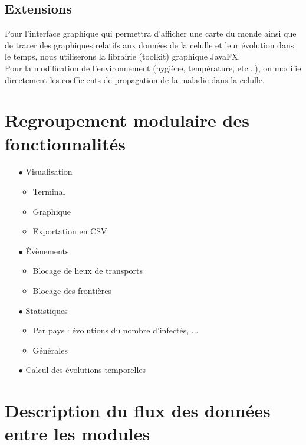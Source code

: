 \documentclass[12pt,a4paper]{report}
\begin{document}
\subsection*{Extensions}
\begin{flushleft}
 	Pour l'interface graphique qui permettra d'afficher une carte du monde ainsi que de tracer des graphiques relatifs aux données de la celulle et leur évolution dans le temps, nous utiliserons la librairie (toolkit) graphique JavaFX. \\
	Pour la modification de l'environnement (hygiène, température, etc...), on modifie directement les coefficients de propagation de la maladie dans la celulle.
\end{flushleft}

\section*{Regroupement modulaire des fonctionnalités}
\begin{flushleft}
	\begin{itemize}
		\item[$\bullet$] Visualisation
			\begin{itemize}
				\item Terminal
				\item Graphique
				\item Exportation en CSV
			\end{itemize}
		\item[$\bullet$] Évènements
			\begin{itemize}
				\item Blocage de lieux de transports
				\item Blocage des frontières
			\end{itemize}
		\item[$\bullet$] Statistiques
			\begin{itemize}
				\item Par pays : évolutions du nombre d'infectés, ...
				\item Générales
			\end{itemize}
		\item[$\bullet$] Calcul des évolutions temporelles
	\end{itemize}
\end{flushleft}

\section*{Description du flux des données entre les modules}
\end{document}
